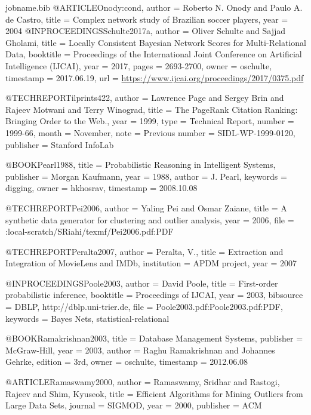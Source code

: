 {\begin{filecontents*}{jobname.bib}
	@ARTICLE{Onody:cond,
		author = {Roberto N. Onody and Paulo A. de Castro},
		title = {Complex network study of Brazilian soccer players},
		year = {2004}
	}
	@INPROCEEDINGS{Schulte2017a,
		author = {Oliver Schulte and Sajjad Gholami},
		title = {Locally Consistent {Bayesian} Network Scores for Multi-Relational
			Data},
		booktitle = {Proceedings of the International Joint Conference on Artificial Intelligence
			(IJCAI)},
		year = {2017},
		pages = {2693-2700},
		owner = {oschulte},
		timestamp = {2017.06.19},
		url = {\url{https://www.ijcai.org/proceedings/2017/0375.pdf}}
	}
	
	
	@TECHREPORT{ilprints422,
		author = {Lawrence Page and Sergey Brin and Rajeev Motwani and Terry Winograd},
		title = {The PageRank Citation Ranking: Bringing Order to the Web.},
		year = {1999},
		type = {Technical Report},
		number = {1999-66},
		month = {November},
		note = {Previous number = SIDL-WP-1999-0120},
		publisher = {Stanford InfoLab}
	}
	
	@BOOK{Pearl1988,
		title = {Probabilistic Reasoning in Intelligent Systems},
		publisher = {Morgan Kaufmann},
		year = {1988},
		author = {J. Pearl},
		keywords = {digging},
		owner = {hkhosrav},
		timestamp = {2008.10.08}
	}
	
	@TECHREPORT{Pei2006,
		author = {Yaling Pei and Osmar Zaiane},
		title = {A synthetic data generator for clustering and outlier analysis},
		year = {2006},
		file = {:local-scratch/SRiahi/texmf/Pei2006.pdf:PDF}
	}
	
	@TECHREPORT{Peralta2007,
		author = {Peralta, V.},
		title = {{Extraction and Integration of MovieLens and IMDb}},
		institution = {APDM project},
		year = {2007}
	}
	
	@INPROCEEDINGS{Poole2003,
		author = {David Poole},
		title = {First-order probabilistic inference},
		booktitle = {Proceedings of IJCAI},
		year = {2003},
		bibsource = {DBLP, http://dblp.uni-trier.de},
		file = {Poole2003.pdf:Poole2003.pdf:PDF},
		keywords = {{B}ayes Nets, statistical-relational}
	}
	
	@BOOK{Ramakrishnan2003,
		title = {Database Management Systems},
		publisher = {McGraw-Hill},
		year = {2003},
		author = {Raghu Ramakrishnan and Johannes Gehrke},
		edition = {3rd},
		owner = {oschulte},
		timestamp = {2012.06.08}
	}
	
	@ARTICLE{Ramaswamy2000,
		author = {Ramaswamy, Sridhar and Rastogi, Rajeev and Shim, Kyuseok},
		title = {Efficient Algorithms for Mining Outliers from Large Data Sets},
		journal = {SIGMOD},
		year = {2000},
		publisher = {ACM}
	}
	

\end{filecontents*}}
